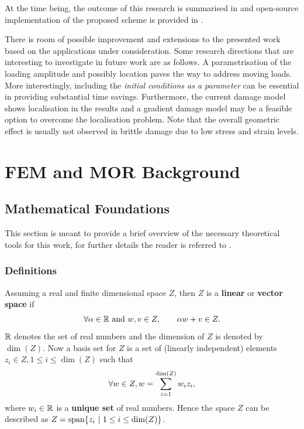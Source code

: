 At the time being, the outcome of this research is summarised in \parencite{bhattacharyya2019kinetic,Alameddin2017d,alameddin_book,Alameddin2019d} and open-source implementation of the proposed scheme is provided in \parencite{romfem}.

There is room of possible improvement and extensions to the presented work based on the applications under consideration. Some research directions that are interesting to investigate in future work are as follows. A parametrisation of the loading amplitude and possibly location paves the way to address moving loads. More interestingly, including the \emph{initial conditions as a parameter} can be essential in providing substantial time savings. Furthermore, the current damage model shows localisation in the results and a gradient damage model may be a feasible option to overcome the localisation problem. Note that the overall geometric effect is usually not observed in brittle damage due to low stress and strain levels.


\appendix


\chapter{FEM and MOR Background}

\section{Mathematical Foundations}
This section is meant to provide a brief overview of the necessary theoretical tools for this work, for further details the reader is referred to \parencite{Patera2006,Kreyszig2013}.

\subsection{Definitions}
Assuming a real and finite dimensional space $Z$, then $Z$ is a \textbf{linear} or \textbf{vector space} if
\begin{equation}
	\forall \alpha \in {\mathbb{ R}} \text{ and } w,v \in Z,\qquad \alpha w + v \in Z.
\end{equation}
${\mathbb{ R}}$ denotes the set of real numbers and the dimension of $Z$ is denoted by $\dim(Z)$. Now a basis set for $Z$ is a set of (linearly independent) elements $z_i\in Z, 1\leq i\leq \dim(Z)$ such that
\begin{equation}
	\forall w \in Z, w = \displaystyle \sum_{i=1}^{\dim(Z)} w_i z_i,
\end{equation}
where $w_i\in {\mathbb{ R}}$ is a \textbf{unique set} of real numbers. Hence the space $Z$ can be described as $Z=\spann \{ z_i \ | \ 1\leq i\leq \dim(Z)\}$.

